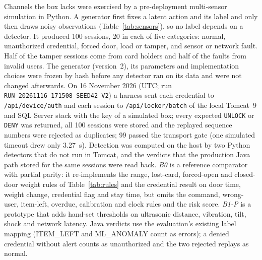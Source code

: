 \documentclass[journal,onecolumn]{IEEEtran}
\begin{document}
Channels the box lacks were exercised by a pre-deployment multi-sensor simulation in Python. A generator first
fixes a latent action and its label and only then draws noisy observations (Table~\ref{tab:sensors}),
so no label depends on a detector. It produced 100 sessions, 20 in each of five categories: normal, unauthorized
credential, forced door, load or tamper, and sensor or network fault. Half of the tamper sessions come from card
holders and half of the faults from invalid users. The generator (version~2), its parameters and implementation choices were frozen by hash
before any detector ran on its data and were not changed afterwards. On 16 November 2026 (UTC; run \texttt{RUN\_20261116\_171508\_SEED42\_V2}) a
harness sent each credential to \texttt{/api/device/auth} and each session to \texttt{/api/locker/batch} of the local
Tomcat~9 and SQL Server stack with the key of a simulated box; every expected \texttt{UNLOCK} or \texttt{DENY} was
returned, all 100 sessions were stored and the replayed sequence numbers were rejected as duplicates; 99 passed the transport
gate (one simulated timeout drew only 3.27~s). Detection was computed on the host by two Python detectors that do
not run in Tomcat, and the verdicts that the production Java path stored for the same sessions were read back.
\emph{B0} is a reference comparator with partial parity: it re-implements the range, lost-card, forced-open and
closed-door weight rules of Table~\ref{tab:rules} and the credential result on door time, weight change, credential
flag and stay time, but omits the command, wrong-user, item-left, overdue, calibration and clock rules and the risk
score. \emph{B1-P} is a prototype that adds hand-set thresholds on ultrasonic distance, vibration, tilt, shock and
network latency. Java verdicts use the evaluation's existing label mapping (ITEM\_LEFT and ML\_ANOMALY count as
errors); a denied credential without alert counts as unauthorized and the two rejected replays as normal.
\end{document}
